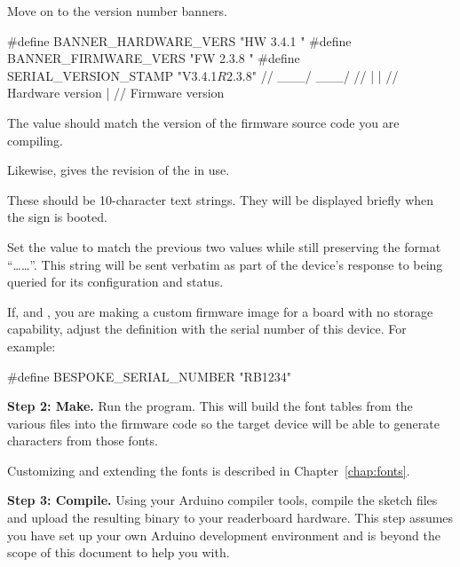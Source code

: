 Move on to the version number banners.

\begin{SourceCode}
#define BANNER_HARDWARE_VERS "HW 3.4.1  "
#define BANNER_FIRMWARE_VERS "FW 2.3.8  "
#define SERIAL_VERSION_STAMP "V3.4.1$R2.3.8$"
//                             \___/  \___/
//                               |      |
//                  Hardware version    |
//                         Firmware version
\end{SourceCode}

The  value should match the version of the firm\-ware source code you are compiling.

Likewise,  gives the revision of the  in use.


These should be 10-character text strings. They will be displayed briefly when the sign is booted.

Set the  value to match the previous two values while still preserving
the format ``\dots{}\dots\z{\$}''. This string will be sent verbatim as part
of the device's response to being queried for its configuration and status.

If, and , you are making a custom firmware image for a board with no 
storage capability, adjust the  definition with the serial
number of this device. For example:
\begin{SourceCode}
#define BESPOKE_SERIAL_NUMBER "RB1234"
\end{SourceCode}

{\bfseries Step 2: Make.}
		Run the  program. This will build the font tables from the various
		 files into the firmware code so the target device will be able to
		generate characters from those fonts.

		Customizing and extending the fonts is described in Chapter~\ref{chap:fonts}.

{\bfseries Step 3: Compile.}
		Using your Arduino compiler tools, compile the  sketch files and upload the
		resulting binary
		to your readerboard hardware. This step assumes you have set up your own Arduino
		development environment and is beyond the scope of this document to help you with.

